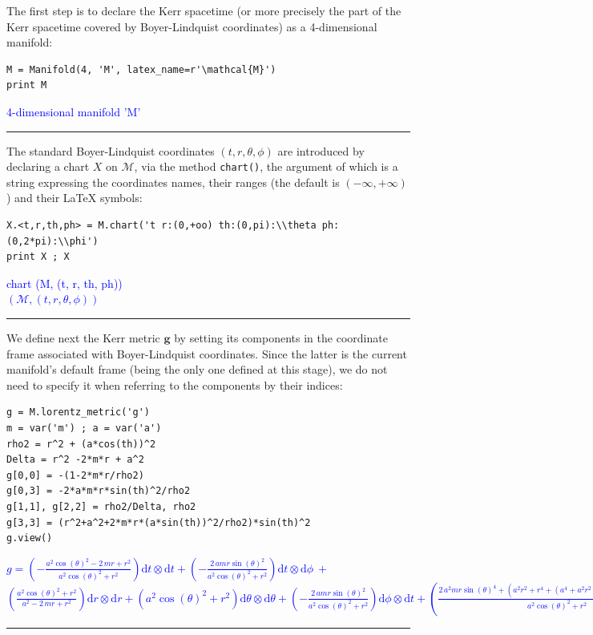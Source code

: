 \documentclass[a4paper]{jpconf}
\newcommand{\code}[1]{\texttt{#1}}
\newcommand{\w}[1]{\bm{#1}}
\newcommand{\soutput}[1]{\textcolor{blue}{#1}\\[-0.8ex]\rule{\textwidth}{0.4pt}}
\begin{document}
The first step is to declare the Kerr spacetime (or more precisely the part of the Kerr spacetime covered by Boyer-Lindquist coordinates) as a 4-dimensional manifold:
\begin{verbatim}
M = Manifold(4, 'M', latex_name=r'\mathcal{M}')
print M
\end{verbatim}
\soutput{4-dimensional manifold 'M'}
The standard Boyer-Lindquist coordinates $(t,r,\theta,\phi)$
are introduced by declaring a chart $X$ on $\mathcal{M}$, via the
method \code{chart()}, the argument of which is a string expressing the
coordinates names, their ranges (the default is $(-\infty,+\infty)$)
and their \LaTeX{} symbols:
\begin{verbatim}
X.<t,r,th,ph> = M.chart('t r:(0,+oo) th:(0,pi):\\theta ph:(0,2*pi):\\phi') 
print X ; X
\end{verbatim}
\soutput{chart (M, (t, r, th, ph))\\
$(\mathcal{M},(t, r, \theta, \phi))$}
We define next the Kerr metric $\w{g}$ by setting its components in the 
coordinate frame associated with Boyer-Lindquist coordinates.
Since the latter is the current manifold's default frame (being the only one defined
at this stage), we do not need to specify it when referring to the components
by their indices:
\begin{verbatim}
g = M.lorentz_metric('g')
m = var('m') ; a = var('a')
rho2 = r^2 + (a*cos(th))^2
Delta = r^2 -2*m*r + a^2
g[0,0] = -(1-2*m*r/rho2)
g[0,3] = -2*a*m*r*sin(th)^2/rho2
g[1,1], g[2,2] = rho2/Delta, rho2
g[3,3] = (r^2+a^2+2*m*r*(a*sin(th))^2/rho2)*sin(th)^2
g.view()
\end{verbatim}
\soutput{$\displaystyle g = \left( -\frac{a^{2} \cos\left(\theta\right)^{2} - 2 \, m r +
r^{2}}{a^{2} \cos\left(\theta\right)^{2} + r^{2}} \right) \mathrm{d}
t\otimes \mathrm{d} t + \left( -\frac{2 \, a m r
\sin\left(\theta\right)^{2}}{a^{2} \cos\left(\theta\right)^{2} + r^{2}}
\right) \mathrm{d} t\otimes \mathrm{d} \phi \ + $\\
$\displaystyle \left( \frac{a^{2}
\cos\left(\theta\right)^{2} + r^{2}}{a^{2} - 2 \, m r + r^{2}} \right)
\mathrm{d} r\otimes \mathrm{d} r + \left( a^{2}
\cos\left(\theta\right)^{2} + r^{2} \right) \mathrm{d} \theta\otimes
\mathrm{d} \theta + \left( -\frac{2 \, a m r
\sin\left(\theta\right)^{2}}{a^{2} \cos\left(\theta\right)^{2} + r^{2}}
\right) \mathrm{d} \phi\otimes \mathrm{d} t + \left( \frac{2 \, a^{2} m
r \sin\left(\theta\right)^{4} + {\left(a^{2} r^{2} + r^{4} +
{\left(a^{4} + a^{2} r^{2}\right)} \cos\left(\theta\right)^{2}\right)}
\sin\left(\theta\right)^{2}}{a^{2} \cos\left(\theta\right)^{2} + r^{2}}
\right) \mathrm{d} \phi\otimes \mathrm{d} \phi $}
\end{document}
